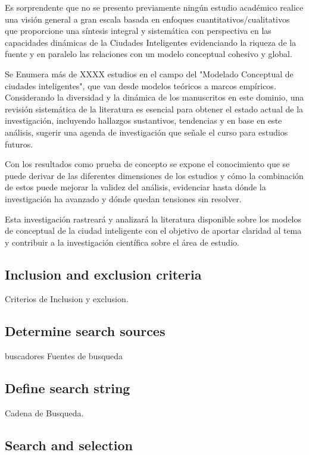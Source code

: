 \documentclass[a4paper,fleqn,spanish]{cas-dc}
\begin{document}
Es sorprendente que no se presento previamente ningún estudio académico
realice una visión general a gran escala basada en enfoques
cuantitativos/cualitativos que proporcione una síntesis integral y sistemática
con perspectiva en las capacidades dinámicas de la Ciudades Inteligentes
evidenciando la riqueza de la fuente y en paralelo las relaciones con un
modelo conceptual cohesivo y global.

Se Enumera más de XXXX estudios en el campo del "Modelado Conceptual de ciudades
inteligentes", que van desde modelos teóricos a marcos empíricos.
Considerando la diversidad y la dinámica de los manuscritos en este dominio,
una revisión sistemática de la literatura es esencial para obtener el estado
actual de la investigación, incluyendo hallazgos sustantivos, tendencias y en
base en este análisis, sugerir una agenda de investigación que señale el curso
para estudios futuros.

Con los resultados como prueba de concepto se expone el conocimiento que se
puede derivar de las diferentes dimensiones de los estudios y cómo la
combinación de estos puede mejorar la validez del análisis, evidenciar hasta dónde la
investigación ha avanzado y dónde quedan tensiones sin resolver.

Esta investigación rastreará y analizará la literatura
disponible sobre los modelos de conceptual de la ciudad inteligente con el
objetivo de aportar claridad al tema y contribuir a la
investigación científica sobre el área de estudio.

\subsection{Inclusion and exclusion criteria}\label{criterio}

Criterios de Inclusion y exclusion.

\subsection{Determine search sources}\label{fuentes}

buscadores
Fuentes de busqueda


\subsection{Define search string}\label{cadena}

Cadena de Busqueda.


\subsection{Search and selection}\label{seleccion}
\end{document}
